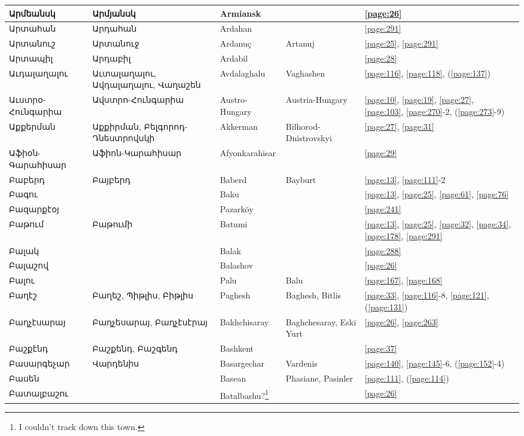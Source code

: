 \begin{center}
\begin{longtable}{|p{}|p{3cm}|p{3cm}|p{2cm}|p{3cm}|}
Արմեանսկ&Արմյանսկ
&Armiansk & &\ref{page:26}\\ \hline
Արտահան&Արդահան & 
{Ardahan}&&\ref{page:291}\\ \hline
Արտանուշ&Արտանուջ 
& {Ardanuç}& Artanuj&\ref{page:25}, \ref{page:291}\\ \hline
Արտապիլ& Արդաբիլ&
{Ardabil}& &\ref{page:28}\\ \hline
Աւդալաղալու&Աւտալաղալու, Ավդալաղալու, Վաղաշեն &
{Avdalaghalu}&Vaghashen &\ref{page:116}, \ref{page:118}, (\ref{page:137})\\ \hline
Աւստրօ-Հունգարիա&Ավստրո-Հունգարիա
&Austro-Hungary &Austria-Hungary &\ref{page:10}, \ref{page:19}, \ref{page:27}, \ref{page:103}, \ref{page:270}-2, (\ref{page:273}-9)\\ \hline
Աքքերման&Աքքիրման,  Բելգորոդ-Դնեստրովսկի&
{Akkerman}& Bilhorod-Dnistrovskyi&\ref{page:27}, \ref{page:31}\\ \hline
Աֆիօն-Գարահիսար&Աֆիոն-Կարահիսար
& Afyonkarahisar& &\ref{page:29}\\ \hline
Բաբերդ& Բայբերդ&
{Baberd} &Bayburt &\ref{page:13}, \ref{page:111}-2\\ \hline
Բագու& &
Baku& &\ref{page:13}, \ref{page:25}, \ref{page:61}, \ref{page:76}\\ \hline
Բազարքէօյ&  
&Pazarköy& &\ref{page:241}\\ \hline
Բաթում& Բաթումի& 
{Batumi}& &\ref{page:13}, \ref{page:25}, \ref{page:32}, \ref{page:34}, \ref{page:178}, \ref{page:291}\\ \hline
Բալակ& & 
Balak & &\ref{page:288}\\ \hline
Բալաշով& &  {Balashov}& &\ref{page:26}\\ \hline
Բալու& &
{Palu}& Balu&\ref{page:167}, \ref{page:168}\\ \hline
Բաղէշ& Բաղեշ, Պիթլիս,  Բիթլիս & {Paghesh}&Baghesh, Bitlis &\ref{page:33}, \ref{page:116}-8, \ref{page:121}, (\ref{page:131})\\ \hline
Բաղչէսարայ& Բաղչեսարայ, Բաղչէսէրայ&{Bakhchisaray} & Baghchesaray, Eski Yurt&\ref{page:26}, \ref{page:263}\\ \hline
Բաշքէնդ &Բաշքենդ, Բաշգենդ &{Bashkent} & &\ref{page:37}\\ \hline
Բասարգեչար& Վարդենիս &
{Basargechar}&Vardenis &\ref{page:140}, \ref{page:145}-6, (\ref{page:152}-4)\\ \hline
Բասեն& &Basean & 
{Phasiane},     Pasinler &\ref{page:111}, (\ref{page:114})\\ \hline
Բատալբաշու& &
{Batalbashu?}\footnote{I couldn't track down this town. }& &\ref{page:26}\\ \hline

\end{longtable}
\end{center}
